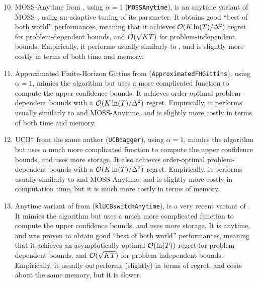 \begin{enumerate}
    \setcounter{enumi}{9}
    \item
    $\mathrm{MOSS}$-$\mathrm{Anytime}$ from \cite{Degenne16}, using $\alpha=1$ (\texttt{MOSSAnytime}),
    is an anytime variant of $\mathrm{MOSS}$ \cite{BubeckSlivkins12}, using an adaptive tuning of its parameter. It obtains good ``best of both world'' performances, meaning that it achieves $\mathcal{O}(K\ln(T)/\Delta^2)$ regret for problem-dependent bounds, and $\mathcal{O}(\sqrt{KT})$ for problem-independent bounds.
    Empirically, it performs usually similarly to \UCB, and is slightly more costly in terms of both time and memory.

    \item
    Approximated Finite-Horizon Gittins from \cite{Lattimore16a} (\texttt{ApproximatedFHGittins}), using $\alpha=1$,
    mimics the \UCB{} algorithm but uses a more complicated function to compute the upper confidence bounds.
    It achieves order-optimal problem-dependent bounds with a $\mathcal{O}(K\ln(T)/\Delta^2)$ regret.
    Empirically, it performs usually similarly to \UCB{} and $\mathrm{MOSS}$-$\mathrm{Anytime}$, and is slightly more costly in terms of both time and memory.

    \item
    $\mathrm{UCB}\dagger$ from the same author \cite{Lattimore2018refining} (\texttt{UCBdagger}), using $\alpha=1$,
    mimics the \UCB{} algorithm but uses a much more complicated function to compute the upper confidence bounds, and uses more storage.
    It also achieves order-optimal problem-dependent bounds with a $\mathcal{O}(K\ln(T)/\Delta^2)$ regret.
    Empirically, it performs usually similarly to \UCB{} and $\mathrm{MOSS}$-$\mathrm{Anytime}$, and is slightly more costly in computation time, but it is much more costly in terms of memory.

    \item
    Anytime variant of \KLUCBswitch{} from \cite{GarivierHadiji2018}
    (\texttt{klUCBswitchAnytime}),
    is a very recent variant of \KLUCB{} \cite{KLUCBJournal}.
    It mimics the \KLUCB{} algorithm but uses a much more complicated function to compute the upper confidence bounds, and uses more storage.
    It is anytime, and was proven to obtain good ``best of both world'' performances, meaning that it achieves an asymptotically optimal $\mathcal{O}(\ln(T))$ regret for problem-dependent bounds, and $\mathcal{O}(\sqrt{KT})$ for problem-independent bounds.
    Empirically, it usually outperforms (slightly) \klUCB{} in terms of regret, and costs about the same memory, but it is slower.


\end{enumerate}
